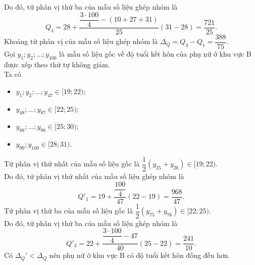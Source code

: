\begin{ex}
{\begin{itemchoice}
			Do đó, tứ phân vị thứ ba của mẫu số  liệu ghép nhóm là \[Q_3=28+\dfrac{\dfrac{3\cdot 100}{4}-(10+27+31)}{25} (31-28)=\dfrac{721}{25}.\]
			Khoảng tứ phân vị của mẫu số  liệu ghép nhóm là $\Delta_Q=Q_3-Q_1=\dfrac{388}{75}$.\\
			Gọi $y_1;y_2;\ldots;y_{100}$ là mẫu số liệu gốc về độ tuổi kết hôn của phụ nữ ở khu vực B được xếp theo thứ  tự không giảm.\\
			Ta  có
			\begin{itemize}
				\item  $y_1;y_2;\ldots;y_{47} \in [19;22)$;
				\item $y_{48};\ldots;y_{87} \in [22;25)$; 
				\item  $y_{88};\ldots;y_{98} \in [25;30)$;
				\item $y_{99};y_{100} \in [28;31)$. 
			\end{itemize}
			Tứ phân vị thứ  nhất của mẫu số liệu gốc là $\dfrac{1}{2} \left(y_{25}+y_{26} \right)\in [19;22)$. \\
			Do đó, tứ phân vị thứ nhất của mẫu số liệu ghép nhóm  là \[Q'_1 =19+\dfrac{\dfrac{100}{4}}{47} (22-19)=\dfrac{968}{47}.\]
			Tứ phân vị thứ ba của mẫu số liệu gốc là $\dfrac{1}{2} \left(y_{75}+y_{76} \right)\in  [22;25)$. \\
			Do đó, tứ phân vị thứ ba của mẫu số liệu ghép  nhóm là \[Q'_3 =22+\dfrac{\dfrac{3\cdot 100}{4}-47}{40} (25-22)=\dfrac{241}{10}.\]
			\itemch Có $\Delta_Q' < \Delta_Q$ nên phụ  nữ ở khu vực B có độ tuổi kết hôn đồng đều hơn.
		\end{itemchoice}
	 }
\end{ex}

